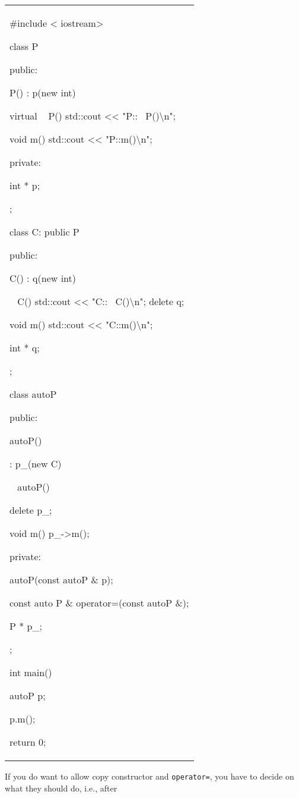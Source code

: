 \begin{longtable}[]{@{}
  >{\raggedright\arraybackslash}p{}@{}}
\toprule\noalign{}
 \\
\midrule\noalign{}
\endhead
\bottomrule\noalign{}
\endlastfoot
\#include < iostream\textgreater{}

class P

{

public:

P() : p(new int) {}

\textbf{ }virtual ~ P() { std::cout <<{}
"P::~ P()\textbackslash n"; }

void m() { std::cout <<{} "P::m()\textbackslash n"; }

private:

int * p;

};

class C: public P

{

public:

C() : q(new int) {}

~ C() { std::cout <<{}
"C::~ C()\textbackslash n"; delete q; }

void m() { std::cout <<{} "C::m()\textbackslash n"; }

int * q;

};

class autoP

{

public:

autoP()

: p_(new C)

{}

~ autoP()

{ delete p_; }

void m() { p_-\textgreater m(); }

private:

autoP(const autoP \& p);

const auto P \& operator=(const autoP \&);

P * p_;

};

int main()

{

autoP p;

p.m();

return 0;

} \\
\end{longtable}

If you do want to allow copy constructor and \texttt{operator=}, you have
to decide on what they should do, i.e., after

